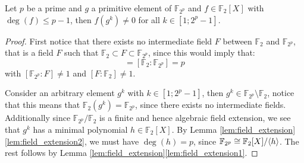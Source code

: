 \begin{lemma}\label{lem:no_roots}
	Let $p$ be a prime and $g$ a primitive element of $\mathbb{F}_{2^p}$ and $f \in \mathbb{F}_{2}[X]$ with $\deg(f) \leq p - 1$, then $f(g^k) \neq 0$ for all $k \in [1; 2^{p} - 1]$.
\end{lemma}
\begin{proof}
	First notice that there exists no intermediate field $F$ between $\mathbb{F}_2$ and $\mathbb{F}_{2^{p}}$, that is a field $F$ such that $\mathbb{F}_{2} \subset F \subset \mathbb{F}_{2^p}$, since this would imply that:
	\begin{equation*}
		[\mathbb{F}_{2^p} : F] [F : \mathbb{F}_2] = [\mathbb{F}_2 : \mathbb{F}_{2^p}] = p
	\end{equation*}
	with $[\mathbb{F}_{2^p} : F] \neq 1$ and $[F : \mathbb{F}_2] \neq 1$.

	Consider an arbitrary element $g^k$ with $k \in [1; 2^p - 1]$, then $g^k \in \mathbb{F}_{2^p} \setminus \mathbb{F}_2$, notice that this means that $\mathbb{F}_2(g^k) = \mathbb{F}_{2^p}$, since there exists no intermediate fields. Additionally since $\mathbb{F}_{2^p} / \mathbb{F}_2$ is a finite and hence algebraic field extension, we see that $g^k$ has a minimal polynomial $h \in \mathbb{F}_2[X]$. By Lemma \ref{lem:field_extension}\ref{lem:field_extension2}, we must have $\deg(h) = p$, since $\mathbb{F}_{2^p} \cong \mathbb{F}_2[X] / \langle h\rangle$. The rest follows by Lemma \ref{lem:field_extension}\ref{lem:field_extension1}.
\end{proof}

